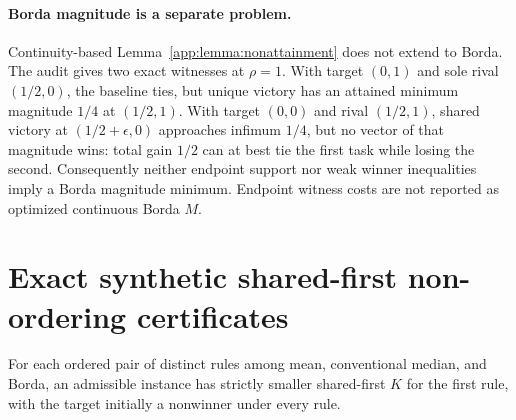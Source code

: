 \paragraph{Borda magnitude is a separate problem.}
Continuity-based Lemma~\ref{app:lemma:nonattainment} does not extend to Borda. The audit gives two exact witnesses at $\rho=1$. With target $(0,1)$ and sole rival $(1/2,0)$, the baseline ties, but unique victory has an attained minimum magnitude $1/4$ at $(1/2,1)$. With target $(0,0)$ and rival $(1/2,1)$, shared victory at $(1/2+\epsilon,0)$ approaches infimum $1/4$, but no vector of that magnitude wins: total gain $1/2$ can at best tie the first task while losing the second. Consequently neither endpoint support nor weak winner inequalities imply a Borda magnitude minimum. Endpoint witness costs are not reported as optimized continuous Borda $M$.

\section{Exact synthetic shared-first non-ordering certificates}
\label{app:examples}\label{app:counterexamples}

\begin{appthm}
\label{app:thm:nonordering}
For each ordered pair of distinct rules among mean, conventional median, and Borda, an admissible instance has strictly smaller shared-first $K$ for the first rule, with the target initially a nonwinner under every rule.
\end{appthm}

